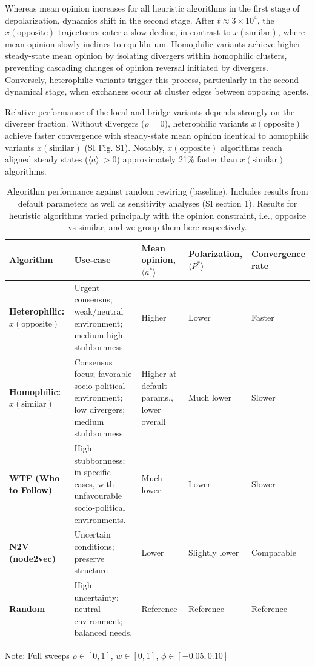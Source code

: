 \documentclass[unnumsec,webpdf,contemporary,large]{oup-authoring-template}%
\theoremstyle{thmstyleone}%
\theoremstyle{thmstyletwo}%
\theoremstyle{thmstylethree}%
\begin{document}
Whereas mean opinion increases for all heuristic algorithms in the first stage of depolarization, dynamics shift in the second stage. After $t \approx 3 \times10^4$, the $x(\text{opposite})$ trajectories enter a slow decline, in contrast to $x(\text{similar})$, where mean opinion slowly inclines to equilibrium. Homophilic variants achieve higher steady-state mean opinion by isolating divergers within homophilic clusters, preventing cascading changes of opinion reversal initiated by divergers. Conversely, heterophilic variants trigger this process, particularly in the second dynamical stage, when exchanges occur at cluster edges between opposing agents.

Relative performance of the local and bridge variants depends strongly on the diverger fraction. Without divergers ($\rho = 0$), heterophilic variants $x(\text{opposite})$ achieve faster convergence with steady-state mean opinion identical to homophilic variants $x(\text{similar})$ (SI Fig. S1). Notably, $x(\text{opposite})$ algorithms reach aligned steady states ($\langle a \rangle \ > 0$) approximately 21\% faster than $x(\text{similar})$ algorithms.

\begin{table}[t]
\centering
\caption{Algorithm performance against random rewiring (baseline). Includes results from default parameters as well as sensitivity analyses (SI section 1). Results for heuristic algorithms varied principally with the opinion constraint, i.e., opposite vs similar, and we group them here respectively.}
\label{tab:algorithm_comparison}
\small
\begin{tabular}{lp{2.5cm}p{1.8cm}p{1.7cm}p{1.6cm}}
\toprule
\textbf{Algorithm} & \textbf{Use-case}& \textbf{Mean opinion, $\langle a^* \rangle $}& \textbf{Polarization, $\langle P^* \rangle $}& \textbf{Convergence rate}\\
\midrule
\textbf{Heterophilic: $x(\text{opposite})$}&
Urgent consensus; weak/neutral environment; medium-high stubbornness.&
Higher &
Lower &
Faster \\
\midrule
\textbf{Homophilic: $x(\text{similar})$}&
Consensus focus; favorable socio-political environment; low divergers; medium stubbornness.&
Higher at default params., lower overall&
Much lower &
Slower \\
\midrule
\textbf{WTF (Who to Follow)}&
High stubbornness; in specific cases, with unfavourable socio-political environments.&
Much lower &
Lower &
Slower \\
\midrule
\textbf{N2V (node2vec)} &
Uncertain conditions; preserve structure &
Lower &
Slightly lower &
Comparable \\
\midrule
\textbf{Random} &
High uncertainty; neutral environment; balanced needs.&
Reference &
Reference &
Reference \\
\bottomrule
\end{tabular}
\vspace{2mm}
\par\noindent\footnotesize{Note: Full sweeps $\rho \in [0, 1]$, $w \in [0, 1]$, $\phi \in [-0.05, 0.10]$}
\end{table}
\end{document}
